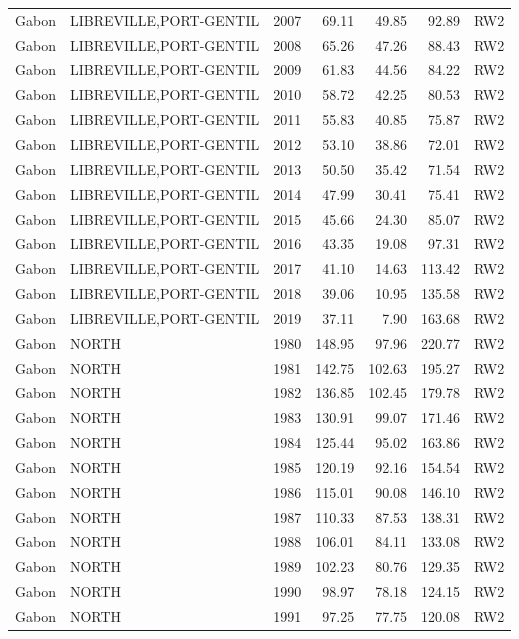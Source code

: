 \begin{longtable}{lllrrrl}
  Gabon & LIBREVILLE,PORT-GENTIL & 2007 & 69.11 & 49.85 & 92.89 & RW2 \\ 
  Gabon & LIBREVILLE,PORT-GENTIL & 2008 & 65.26 & 47.26 & 88.43 & RW2 \\ 
  Gabon & LIBREVILLE,PORT-GENTIL & 2009 & 61.83 & 44.56 & 84.22 & RW2 \\ 
  Gabon & LIBREVILLE,PORT-GENTIL & 2010 & 58.72 & 42.25 & 80.53 & RW2 \\ 
  Gabon & LIBREVILLE,PORT-GENTIL & 2011 & 55.83 & 40.85 & 75.87 & RW2 \\ 
  Gabon & LIBREVILLE,PORT-GENTIL & 2012 & 53.10 & 38.86 & 72.01 & RW2 \\ 
  Gabon & LIBREVILLE,PORT-GENTIL & 2013 & 50.50 & 35.42 & 71.54 & RW2 \\ 
  Gabon & LIBREVILLE,PORT-GENTIL & 2014 & 47.99 & 30.41 & 75.41 & RW2 \\ 
  Gabon & LIBREVILLE,PORT-GENTIL & 2015 & 45.66 & 24.30 & 85.07 & RW2 \\ 
  Gabon & LIBREVILLE,PORT-GENTIL & 2016 & 43.35 & 19.08 & 97.31 & RW2 \\ 
  Gabon & LIBREVILLE,PORT-GENTIL & 2017 & 41.10 & 14.63 & 113.42 & RW2 \\ 
  Gabon & LIBREVILLE,PORT-GENTIL & 2018 & 39.06 & 10.95 & 135.58 & RW2 \\ 
  Gabon & LIBREVILLE,PORT-GENTIL & 2019 & 37.11 & 7.90 & 163.68 & RW2 \\ 
  Gabon & NORTH & 1980 & 148.95 & 97.96 & 220.77 & RW2 \\ 
  Gabon & NORTH & 1981 & 142.75 & 102.63 & 195.27 & RW2 \\ 
  Gabon & NORTH & 1982 & 136.85 & 102.45 & 179.78 & RW2 \\ 
  Gabon & NORTH & 1983 & 130.91 & 99.07 & 171.46 & RW2 \\ 
  Gabon & NORTH & 1984 & 125.44 & 95.02 & 163.86 & RW2 \\ 
  Gabon & NORTH & 1985 & 120.19 & 92.16 & 154.54 & RW2 \\ 
  Gabon & NORTH & 1986 & 115.01 & 90.08 & 146.10 & RW2 \\ 
  Gabon & NORTH & 1987 & 110.33 & 87.53 & 138.31 & RW2 \\ 
  Gabon & NORTH & 1988 & 106.01 & 84.11 & 133.08 & RW2 \\ 
  Gabon & NORTH & 1989 & 102.23 & 80.76 & 129.35 & RW2 \\ 
  Gabon & NORTH & 1990 & 98.97 & 78.18 & 124.15 & RW2 \\ 
  Gabon & NORTH & 1991 & 97.25 & 77.75 & 120.08 & RW2 \\ 

\end{longtable}
